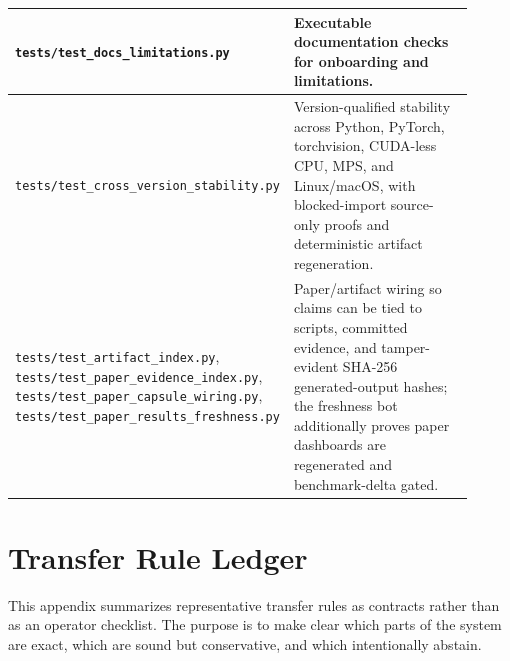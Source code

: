 \documentclass[11pt]{article}
\begin{document}
\begin{longtable}{|p{0.30\linewidth}|p{0.61\linewidth}|}
\texttt{tests/test\_docs\_limitations.py} &
Executable documentation checks for onboarding and limitations. \\
\hline
\texttt{tests/test\_cross\_version\_stability.py} &
Version-qualified stability across Python, PyTorch, torchvision, CUDA-less CPU,
MPS, and Linux/macOS, with blocked-import source-only proofs and deterministic
artifact regeneration. \\
\hline
\texttt{tests/test\_artifact\_index.py},
\texttt{tests/test\_paper\_evidence\_index.py},
\texttt{tests/test\_paper\_capsule\_wiring.py},
\texttt{tests/test\_paper\_results\_freshness.py} &
Paper/artifact wiring so claims can be tied to scripts, committed evidence, and
tamper-evident SHA-256 generated-output hashes; the freshness bot additionally
proves paper dashboards are regenerated and benchmark-delta gated. \\
\hline
\end{longtable}

\section{Transfer Rule Ledger}

This appendix summarizes representative transfer rules as contracts rather than
as an operator checklist.  The purpose is to make clear which parts of the
system are exact, which are sound but conservative, and which intentionally
abstain.
\end{document}
